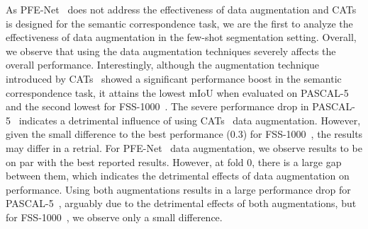 As PFE-Net~\cite{tian2020prior} does not address the effectiveness of data augmentation and CATs~\cite{cho2021semantic} is designed for the semantic correspondence task, we are the first to analyze the effectiveness of data augmentation in the few-shot segmentation setting. Overall, we observe that using the data augmentation techniques severely affects the overall performance. Interestingly, although the augmentation technique introduced by CATs~\cite{cho2021semantic} showed a significant performance boost in the semantic correspondence task, it attains the lowest mIoU when evaluated on PASCAL-5~\cite{shaban2017one} and the second lowest for FSS-1000~\cite{li2020fss}. The severe performance drop in PASCAL-5~\cite{shaban2017one} indicates a detrimental influence of using CATs~\cite{cho2021semantic} data augmentation. However, given the small difference to the best performance (0.3) for FSS-1000~\cite{li2020fss}, the results may differ in a retrial. For PFE-Net~\cite{tian2020prior} data augmentation, we observe results to be on par with the best reported results. However, at fold 0, there is a large gap between them, which indicates the detrimental effects of data augmentation on performance. Using both augmentations results in a large performance drop for PASCAL-5~\cite{shaban2017one}, arguably due to the detrimental effects of both augmentations, but for FSS-1000~\cite{li2020fss}, we observe only a small difference. 


